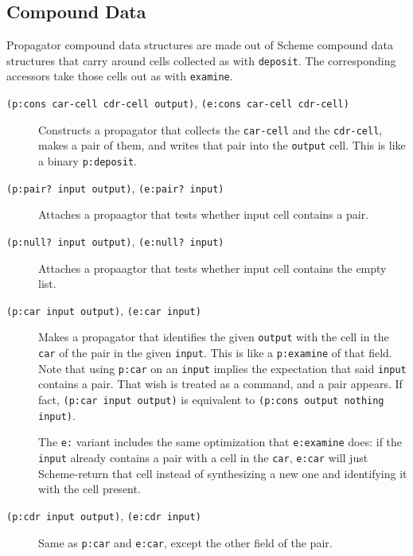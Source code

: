 \documentclass[12pt,letterpaper,english]{article}
\begin{document}

\hypertarget{compound-data}{}
\subsection{Compound Data}
\label{compound-data}

Propagator compound data structures are made out of Scheme compound
data structures that carry around cells collected as with \texttt{deposit}.
The corresponding accessors take those cells out as with \texttt{examine}.
\begin{description}
\item[{\texttt{(p:cons car-cell cdr-cell output)}, \texttt{(e:cons car-cell cdr-cell)}}] \leavevmode 
Constructs a propagator that collects the \texttt{car-cell} and the
\texttt{cdr-cell}, makes a pair of them, and writes that pair into the
\texttt{output} cell.  This is like a binary \texttt{p:deposit}.

\item[{\texttt{(p:pair? input output)}, \texttt{(e:pair? input)}}] \leavevmode 
Attaches a propaagtor that tests whether input cell contains a
pair.

\item[{\texttt{(p:null? input output)}, \texttt{(e:null? input)}}] \leavevmode 
Attaches a propaagtor that tests whether input cell contains
the empty list.

\item[{\texttt{(p:car input output)}, \texttt{(e:car input)}}] \leavevmode 
Makes a propagator that identifies the given \texttt{output} with the
cell in the \texttt{car} of the pair in the given \texttt{input}.  This is
like a \texttt{p:examine} of that field.  Note that using \texttt{p:car} on an
\texttt{input} implies the expectation that said \texttt{input} contains a
pair.  That wish is treated as a command, and a pair appears.
If fact, \texttt{(p:car input output)} is equivalent to
\texttt{(p:cons output nothing input)}.

The \texttt{e:} variant includes the same optimization that \texttt{e:examine}
does: if the \texttt{input} already contains a pair with a cell in the
\texttt{car}, \texttt{e:car} will just Scheme-return that cell instead of
synthesizing a new one and identifying it with the cell present.

\item[{\texttt{(p:cdr input output)}, \texttt{(e:cdr input)}}] \leavevmode 
Same as \texttt{p:car} and \texttt{e:car}, except the other field of the
pair.

\end{description}
\end{document}
